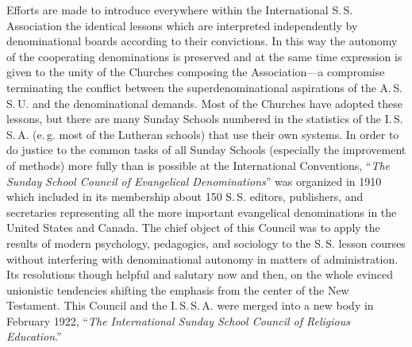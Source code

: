 Efforts are made to introduce everywhere within the International S.\,S. Association the identical lessons which are interpreted independently by denominational boards according to their convictions. In this way the autonomy of the cooperating denominations is preserved and at the same time expression is given to the unity of the Churches composing the Association—a compromise terminating the conflict between the superdenominational aspirations of the A.\,S.\,S.\,U. and the denominational demands. Most of the Churches have adopted these lessons, but there are many Sunday Schools numbered in the statistics of the I.\,S.\,S.\,A. (e.\,g. most of the Lutheran schools) that use their own systems. In order to do justice to the common tasks of all Sunday Schools (especially the improvement of methods) more fully than is possible at the International Conventions, “\emph{The Sunday}
\emph{School Council of Evangelical Denominations}” was organized in 1910 which included in its membership about 150 S.\,S. editors, publishers, and secretaries representing all the more important evangelical denominations in the United States and Canada. The chief object of this Council was to apply the results of modern psychology, pedagogics, and sociology to the S.\,S. lesson courses without interfering with denominational autonomy in matters of administration. Its resolutions though helpful and salutary now and then, on the whole evinced unionistic tendencies shifting the emphasis from the center of the New Testament. This Council and the I.\,S.\,S.\,A. were merged into a new body in February 1922, “\emph{The International Sunday School Council of Religious Education}.”

